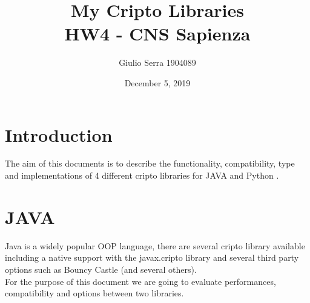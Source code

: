 \documentclass{article}
\begin{document}
\title{%
  My Cripto Libraries\\
  \large HW4 - CNS Sapienza}

\author{Giulio Serra 1904089}
\date{December 5, 2019}

\maketitle

\begin{titlepage}
\end{titlepage}

\tableofcontents

\begin{titlepage}
\end{titlepage}

\section{Introduction}\label{sec:intro}
The aim of this documents is to describe the functionality, compatibility, type and implementations of 4 different cripto libraries for JAVA and Python .

\section{JAVA}\label{sec:java}
Java is a widely popular OOP language, there are several cripto library available including a native support with the javax.cripto library and several third party options such as Bouncy Castle (and several others).\\
For the purpose of this document we are going to evaluate performances, compatibility and options between two libraries.
\end{document}
